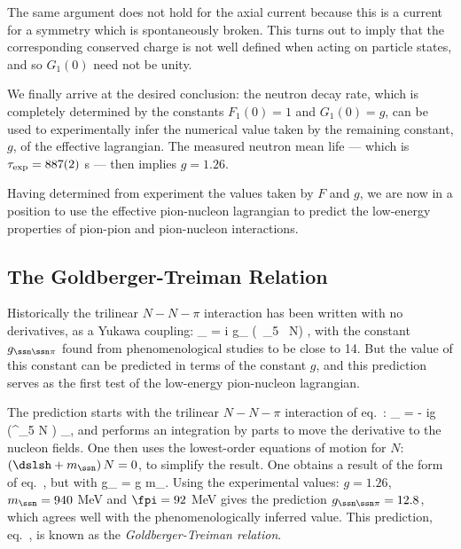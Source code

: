 \documentclass[12pt,epsf]{report}
\begin{document}
The same argument does not hold for the axial current
because this is a current for a symmetry which is
spontaneously broken. This turns out to imply that the
corresponding conserved charge is not well defined when
acting on particle states, and so $G_1(0)$ need not be
unity.

We finally arrive at the desired conclusion: the neutron
decay rate, which is completely determined by the constants
$F_1(0) = 1$ and $G_1(0) = g$, can be used to experimentally
infer the numerical value taken by the remaining constant,
$g$, of the effective lagrangian. The measured neutron mean
life --- which is $\tau_{\rm exp} = 887(2)$ s --- then
implies $g = 1.26$.

Having determined from experiment the values taken by $F$
and $g$, we are now in a position to use the effective
pion-nucleon lagrangian to predict the low-energy
properties of pion-pion and pion-nucleon interactions.

\subsection{The Goldberger-Treiman Relation}

Historically the trilinear $N-N-\pi$ interaction has been
written with no derivatives, as a Yukawa coupling: 
%
\eq
\label{yukawaform}
\Scl_{\ssn\ssn\pi} = i g_{\ssn\ssn\pi} \; 
(\Nbr \, \gamma_5 \vec\tau \, N)  \cdot
\vec\pi,
\eeq
%
with the constant $g_{\ssn\ssn\pi}$ found from
phenomenological studies to be close to 14. But the value
of this constant can be predicted in terms of the constant
$g$, and this prediction serves as the first test of the
low-energy pion-nucleon lagrangian.

The prediction starts with the trilinear $N-N-\pi$
interaction of
eq.~:
%
\eq
\label{trilinearnnpi}
\Scl_{\ssn\ssn\pi} = - \; {ig  \fpi} \, 
\left(\Nbr \gamma^\mu \gamma_5
\vec \tau N \right) \cdot \partial_\mu \vec \pi , \eeq
%
and performs an integration by parts to move the derivative
to the nucleon fields. One then uses the lowest-order
equations of motion for $N$: \ie\ $(\dslsh + m_\ssn)\, N =
0$, to simplify the result. One obtains a result of the
form of eq.~, but with  
%
\eq
\label{predictionforgpin}
g_{\ssn\ssn\pi} = {g m_\ssn \over \fpi}.
\eeq
%
Using the experimental values: $g = 1.26$, $m_\ssn = 940$
MeV and $\fpi = 92$ MeV gives the prediction
$g_{\ssn\ssn\pi} = 12.8$, which agrees well with the
phenomenologically inferred value. This prediction,
eq.~, is known as the {\em
Goldberger-Treiman relation}.
\end{document}

